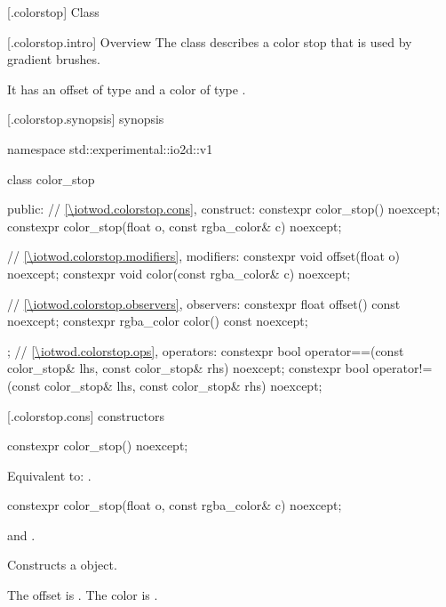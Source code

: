  [\iotwod.colorstop] {Class }

 [\iotwod.colorstop.intro] {Overview}
\pnum
{}%
The class  describes a color stop that is used by gradient brushes.

\pnum
It has an offset of type  and a color of type .

 [\iotwod.colorstop.synopsis] { synopsis}

\begin{codeblock}
namespace std::experimental::io2d::v1 {
  class color_stop {
  public:
  	// \ref{\iotwod.colorstop.cons}, construct:
  	constexpr color_stop() noexcept;
    constexpr color_stop(float o, const rgba_color& c) noexcept;
    
    // \ref{\iotwod.colorstop.modifiers}, modifiers:
    constexpr void offset(float o) noexcept;
	constexpr void color(const rgba_color& c) noexcept;
	
    // \ref{\iotwod.colorstop.observers}, observers:
	constexpr float offset() const noexcept;
	constexpr rgba_color color() const noexcept;
  };
  // \ref{\iotwod.colorstop.ops}, operators:
  constexpr bool operator==(const color_stop& lhs, const color_stop& rhs)
    noexcept;
  constexpr bool operator!=(const color_stop& lhs, const color_stop& rhs)
    noexcept;
}
\end{codeblock}

 [\iotwod.colorstop.cons] { constructors}

%
\begin{itemdecl}
constexpr color_stop() noexcept;
\end{itemdecl}
\begin{itemdescr}
\pnum
\effects
Equivalent to: .
\end{itemdescr}

%
\begin{itemdecl}
constexpr color_stop(float o, const rgba_color& c) noexcept;
\end{itemdecl}
\begin{itemdescr}
\pnum
\requires
{} and .

\pnum
\effects
Constructs a  object.

\pnum
The offset is . The color is .
\end{itemdescr}

